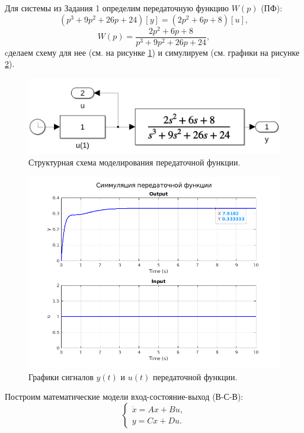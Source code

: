 Для системы из Задания 1 определим передаточную функцию $W(p)$ (ПФ):
$$
(p^3+9p^2+26p+24)[y]=(2p^2+6p+8)[u],
$$
\begin{equation}
    \label{eq:pf1}
    W(p)=\frac{2p^2+6p+8}{p^3+9p^2+26p+24},
\end{equation}
cделаем схему для нее (см. на рисунке \ref{fig:task2_slx_tf}) и симулируем 
(см. графики на рисунке \ref{fig:task2_out_tf}).
\begin{figure}[htbp]
    \centering
    \includegraphics[width=0.6\linewidth]{figs/task_2_slx_tf.png}
    \caption{Структурная схема моделирования передаточной функции.}
    \label{fig:task2_slx_tf}
\end{figure}
\begin{figure}[htbp]
    \centering
    \includegraphics[width=\linewidth]{figs/task_2_out_tf.png}
    \caption{Графики сигналов $y(t)$ и $u(t)$ передаточной функции.}
    \label{fig:task2_out_tf}
\end{figure}
Построим  математические модели вход-состояние-выход (В-С-В):
\begin{equation*}
    \begin{cases}
        \dot x = Ax + Bu,\\
        y = Cx + Du.
    \end{cases}
\end{equation*}

